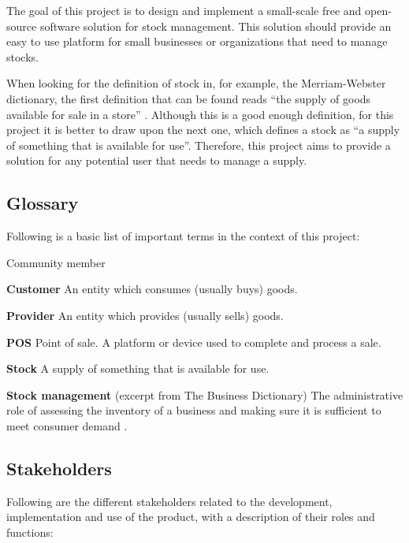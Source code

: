 The goal of this project is to design and implement a small-scale free and open-source software solution for stock management. This solution should provide an easy to use platform for small businesses or organizations that need to manage stocks.

When looking for the definition of stock in, for example, the Merriam-Webster dictionary, the first definition that can be found reads “the supply of goods available for sale in a store” \cite{1}. Although this is a good enough definition, for this project it is better to draw upon the next one, which defines a stock as “a supply of something that is available for use”. Therefore, this project aims to provide a solution for any potential user that needs to manage a supply.

\subsection{Glossary}
Following is a basic list of important terms in the context of this project:

\begin{labeling}{Community member}
\item[\textbf{Customer}]{An entity which consumes (usually buys) goods.}
\item[\textbf{Provider}]{An entity which provides (usually sells) goods.}
\item[\textbf{POS}]{Point of sale. A platform or device used to complete and process a sale.}
\item[\textbf{Stock}]{A supply of something that is available for use.}
\item[\textbf{Stock management}]{(excerpt from The Business Dictionary) The administrative role of assessing the inventory of a business and making sure it is sufficient to meet consumer demand \cite{3}.}
\end{labeling}

\subsection{Stakeholders}
Following are the different stakeholders related to the development, implementation and use of the product, with a description of their roles and functions:

